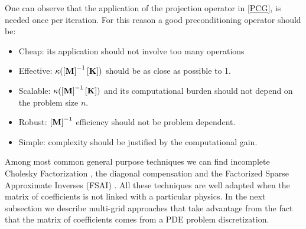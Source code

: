 One can observe that the application of the projection operator in \ref{PCG}, is needed once per iteration. For this reason a good preconditioning operator should be:
\begin{itemize}
\item Cheap: its application should not involve too many operations
\item Effective: $\kappa(\left[{\mathbf{M}}\right]^{-1}\left[{\mathbf{K}}\right])$ should be as close as possible to 1.
\item Scalable:  $\kappa(\left[{\mathbf{M}}\right]^{-1}\left[{\mathbf{K}}\right])$ and its computational burden should not depend on the problem size $n$.
\item Robust:  $\left[{\mathbf{M}}\right]^{-1}$ efficiency should not be problem dependent.
\item Simple:  complexity should be justified by the computational gain.
\end{itemize}
Among most common general purpose techniques we can find incomplete Cholesky Factorization \cite{kershaw1978incomplete}, the diagonal compensation \cite{jacobi1845ueber} and the Factorized Sparse Approximate Inverses (FSAI) \cite{buleev1960numerical,buleev1960numerical,meijerink1977iterative,il1992iterative,varga1960boundary}. All these techniques are well adapted when the matrix of coefficients is not linked with a particular physics. In the next subsection we describe multi-grid approaches that take advantage from the fact that the matrix of coefficients comes from a PDE problem discretization.
